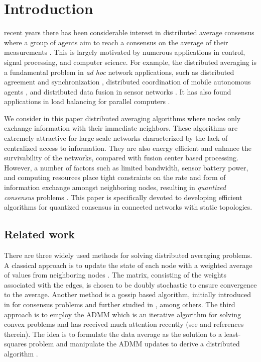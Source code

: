 \documentclass[journal]{IEEEtran}
\begin{document}
\section{Introduction}
 recent years there has been considerable interest in distributed average consensus where a group of agents aim to reach a consensus on the average of their measurements \cite{Ren2007,Cao2013,Lynch1996distributed, Ren2005,Xiao2005,Xu1996,Kashyap2007,Xiao2004, Jakovetic2010,Nedic2009,Aysal2009,Boyd2006,Schizas2008,Zhu2009,Erseghe2011,Aysal2008,Kar2010,Chamie2014,Carli2010}. This is largely motivated by numerous applications in control, signal processing, and computer science. For example, the distributed averaging is a fundamental problem in {\it{ad hoc}} network applications, such as distributed agreement and synchronization \cite{Lynch1996distributed}, distributed coordination of mobile autonomous agents \cite{Ren2005}, and distributed data fusion in sensor networks \cite{Xiao2005}. It has also found applications in load balancing for parallel computers \cite{Xu1996}.


We consider in this paper distributed averaging algorithms where nodes only exchange information with their immediate neighbors. These algorithms are extremely attractive for large scale networks characterized by the lack of centralized access to information. They are also energy efficient and enhance the survivability of the networks, compared with fusion center based processing. However, a number of factors such as limited bandwidth, sensor battery power, and computing resources place tight constraints on the rate and form of information exchange amongst neighboring nodes, resulting in {\em quantized consensus} problems \cite{Ren2007,Kashyap2007}. This paper is specifically devoted to developing efficient algorithms for quantized consensus in connected networks with static topologies.
\subsection{Related work}
There are three widely used methods for solving distributed averaging problems. A classical approach is to update the state of each node with a weighted average of values from neighboring nodes \cite{Xiao2004,Jakovetic2010,Nedic2009}. The matrix, consisting of the weights associated with the edges, is chosen to be doubly stochastic to ensure convergence to the average. Another method is a gossip based algorithm, initially introduced in \cite {Tsitsiklis1984} for consensus problems and further studied in \cite{Kashyap2007,Aysal2009, Boyd2006}, among others. The third approach is to employ the ADMM which is an iterative algorithm for solving convex problems and has received much attention recently (see \cite{BoydADMM} and references therein). The idea is to formulate the data average as the solution to a least-squares problem and manipulate the ADMM updates to derive a distributed algorithm  \cite{Schizas2008, Zhu2009, Erseghe2011}.
\end{document}

